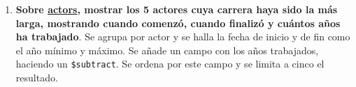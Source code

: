 \documentclass[a4paper,onecolumn]{article}
\begin{document}
\begin{sloppypar}
\begin{enumerate}
\begin{figure}[h!]
\begin{subfigure}[b]{0.5\textwidth}
            \end{subfigure}
            \hfill
            \begin{subfigure}[b]{0.5\textwidth}
            \end{subfigure}
       \end{figure}
    \newpage
    \item \textbf{Sobre \underline{actors}, mostrar los 5 actores cuya carrera haya sido la más larga, mostrando cuando comenzó, cuando finalizó y cuántos años ha trabajado}.
    Se agrupa por actor y se halla la fecha de inicio y de fin como el año mínimo y máximo. Se añade un campo con los años trabajados, haciendo un \texttt{\$subtract}.
    Se ordena por este campo y se limita a cinco el resultado.
    \begin{center}
        \begin{figure}[H]
            \centering

\end{figure}
\end{center}
\end{enumerate}
\end{sloppypar}
\end{document}
